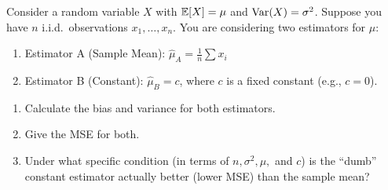 \begin{myexercise} 
Consider a random variable $X$ with $\mathbb{E}[X] = \mu$ and $\operatorname{Var}(X) = \sigma^2$. Suppose you have $n$ i.i.d.\ observations $x_1, \dots, x_n$. You are considering two estimators for $\mu$:
\begin{enumerate}
\item[]  Estimator A (Sample Mean): $\hat{\mu}_A = \frac{1}{n}\sum x_i$
\item[] Estimator B (Constant): $\hat{\mu}_B = c$, where $c$ is a fixed constant (e.g., $c=0$).
\end{enumerate}

\begin{enumerate}
\item  Calculate the bias and variance for both estimators.
\item  Give the MSE for both.
\item Under what specific condition (in terms of $n, \sigma^2, \mu,$ and $c$) is the ``dumb'' constant estimator actually better (lower MSE) than the sample mean?
\end{enumerate}
\end{myexercise}




